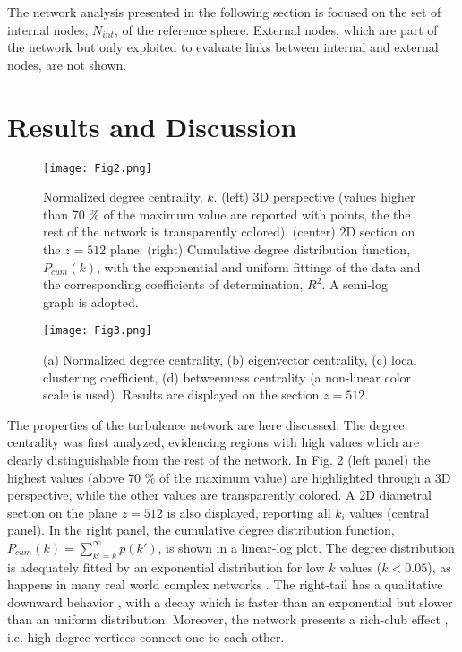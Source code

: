 \documentclass{ws-ijbc}
\begin{document}
\noindent The network analysis presented in the following section is focused on the set of internal nodes, $N_{int}$, of the reference sphere. External nodes, which are part of the network but only exploited to evaluate links between internal and external nodes, are not shown.

\section{Results and Discussion}

\begin{figure}[h!]
\texttt{[image: Fig2.png]}
\caption{Normalized degree centrality, $k$. (left) 3D perspective (values higher than 70 $\%$ of the maximum value are reported with points, the the rest of the network is transparently colored). (center) 2D section on the $z=512$ plane. (right) Cumulative degree distribution function, $P_{cum}(k)$, with the exponential and uniform fittings of the data and the corresponding coefficients of determination, $R^2$. A semi-log graph is adopted.}
\label{DC}
\end{figure}

\begin{figure}[h!]
\texttt{[image: Fig3.png]}
\caption{(a) Normalized degree centrality, (b) eigenvector centrality, (c) local clustering coefficient, (d) betweenness centrality (a non-linear color scale is used). Results are displayed on the section $z=512$.}
\label{comparison}
\end{figure}

The properties of the turbulence network are here discussed. The degree centrality was first analyzed, evidencing regions with high values which are clearly distinguishable from the rest of the network. In Fig. 2 (left panel) the highest values (above 70 $\%$ of the maximum value) are highlighted through a 3D perspective, while the other values are transparently colored. A 2D diametral section on the plane $z=512$ is also displayed, reporting all $k_i$ values (central panel). In the right panel, the cumulative degree distribution function, $P_{cum}(k)=\sum_{k'=k}^{\infty} p(k')$, is shown in a linear-log plot. The degree distribution is adequately fitted by an exponential distribution for low $k$ values ($k<0.05$), as happens in many real world complex networks \cite{Dunne,Deng}. The right-tail has a qualitative downward behavior \cite{Dunne}, with a decay which is faster than an exponential but slower than an uniform distribution. Moreover, the network presents a rich-club effect \cite{Boccaletti2006}, i.e. high degree vertices connect one to each other.
\end{document}
